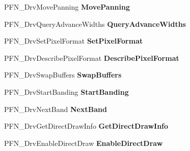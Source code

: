 \begin{DoxyCompactItemize}
P\+F\+N\+\_\+\+Drv\+Move\+Panning {\bfseries Move\+Panning}
\item 
\mbox{\label{struct___d_r_i_v_e_r___f_u_n_c_t_i_o_n_s_afac1364ce7dae19e433c8e33222b840a}} 
P\+F\+N\+\_\+\+Drv\+Query\+Advance\+Widths {\bfseries Query\+Advance\+Widths}
\item 
\mbox{\label{struct___d_r_i_v_e_r___f_u_n_c_t_i_o_n_s_a8599d1840f3cfeb62f5a728a7c03bc08}} 
P\+F\+N\+\_\+\+Drv\+Set\+Pixel\+Format {\bfseries Set\+Pixel\+Format}
\item 
\mbox{\label{struct___d_r_i_v_e_r___f_u_n_c_t_i_o_n_s_aaecb846e916eee1e14149b3e2d7cf62b}} 
P\+F\+N\+\_\+\+Drv\+Describe\+Pixel\+Format {\bfseries Describe\+Pixel\+Format}
\item 
\mbox{\label{struct___d_r_i_v_e_r___f_u_n_c_t_i_o_n_s_abd0c73d5940ad41be71876ccb70bf6a8}} 
P\+F\+N\+\_\+\+Drv\+Swap\+Buffers {\bfseries Swap\+Buffers}
\item 
\mbox{\label{struct___d_r_i_v_e_r___f_u_n_c_t_i_o_n_s_a579e51b64c9ff9b63ed4e9208b937b67}} 
P\+F\+N\+\_\+\+Drv\+Start\+Banding {\bfseries Start\+Banding}
\item 
\mbox{\label{struct___d_r_i_v_e_r___f_u_n_c_t_i_o_n_s_aa982c9045feefe56aa27b38317a0e76a}} 
P\+F\+N\+\_\+\+Drv\+Next\+Band {\bfseries Next\+Band}
\item 
\mbox{\label{struct___d_r_i_v_e_r___f_u_n_c_t_i_o_n_s_ad101815ca4f7bf67ce11973fc9e76d6d}} 
P\+F\+N\+\_\+\+Drv\+Get\+Direct\+Draw\+Info {\bfseries Get\+Direct\+Draw\+Info}
\item 
\mbox{\label{struct___d_r_i_v_e_r___f_u_n_c_t_i_o_n_s_a20eea6b9f2745062d7a8cc72daee73a8}} 
P\+F\+N\+\_\+\+Drv\+Enable\+Direct\+Draw {\bfseries Enable\+Direct\+Draw}
\item 
\mbox{\label{struct___d_r_i_v_e_r___f_u_n_c_t_i_o_n_s_abb142edc29ac2f465f06434c1920ab6d}} 

\end{DoxyCompactItemize}
